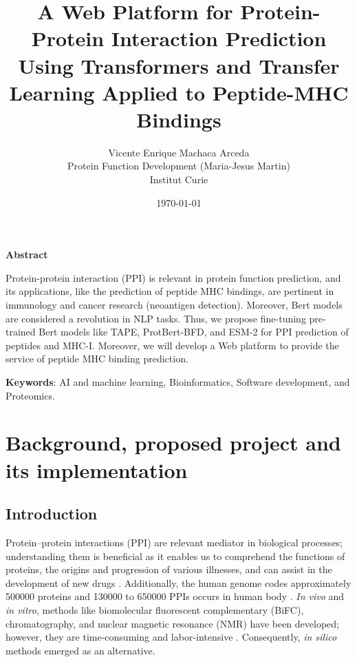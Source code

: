 \documentclass[a4paper,11pt]{article}
\title{ A Web Platform for Protein-Protein Interaction Prediction Using Transformers and Transfer Learning Applied to Peptide-MHC Bindings }
\author{Vicente Enrique Machaca Arceda \\ Protein Function Development (Maria-Jesus Martin) \\ Institut Curie}
\date{\today}
\begin{document}
	
\maketitle
	
\begin{center}
	\begin{large}
		\textbf{Abstract}
	\end{large} 
\end{center}

	\vspace{0.1cm}
	
	Protein-protein interaction (PPI) is relevant in protein function prediction, and its applications, like the prediction of peptide MHC bindings, are pertinent in immunology and cancer research (neoantigen detection). Moreover, Bert models are considered a revolution in NLP tasks. Thus, we propose fine-tuning pre-trained Bert models like  TAPE, ProtBert-BFD, and ESM-2 for PPI prediction of peptides and MHC-I. Moreover, we will develop a Web platform to provide the service of peptide MHC binding prediction.
	


	
\textbf{Keywords}: 	AI and machine learning, Bioinformatics, Software development, and Proteomics.
	
	

\section{Background, proposed project and its implementation}

\subsection{Introduction}

Protein–protein interactions (PPI) are relevant mediator in biological processes; understanding  them is beneficial as it enables us to comprehend the functions of proteins, the origins and progression of various illnesses, and can assist in the development of new drugs  \cite{hu2022deep,jha2023prediction}. Additionally, the human genome codes approximately 500000 proteins and 130000 to 650000 PPIs occurs in human body \cite{hu2022deep}. \textit{In vivo} and \textit{in vitro}, methods like biomolecular fluorescent complementary (BiFC), chromatography, and nuclear magnetic resonance (NMR) have been developed; however, they are time-consuming and labor-intensive \cite{rao2014protein,hu2022deep}. Consequently, \textit{in silico} methods  emerged as an alternative.\\
\end{document}
